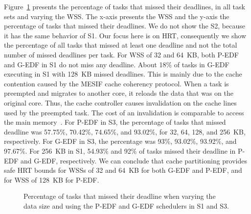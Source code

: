 \documentclass[10pt, conference, compsocconf]{IEEEtran}
\newcommand{\fig}[4][ht!]{
  \begin{figure}[#1]
    {\centering{\texttt{[image: fig/\#2]}}\par}
    \caption{#3}
    \label{fig:#2}
  \end{figure}
}
\begin{document}
Figure~\ref{fig:percentage_of_missed_deadlines} presents the percentage of tasks that missed their deadlines, in all task sets and varying the WSS. The x-axis presents the WSS and the y-axis the percentage of tasks that missed their deadlines. We do not show the S2, because it has the same behavior of S1. Our focus here is on HRT, consequently we show the percentage of all tasks that missed at least one deadline and not the total number of missed deadlines per task. For WSS of 32 and 64~KB, both P-EDF and G-EDF in S1 do not miss any deadline. About 18\% of tasks in G-EDF executing in S1 with 128~KB missed deadlines. This is mainly due to the cache contention caused by the MESIF cache coherency protocol. When a task is preempted and migrates to another core, it reloads the data that was on the original core. Thus, the cache controller causes invalidation on the cache lines used by the preempted task. The cost of an invalidation is comparable to access the main memory~\cite{intelopt}. For P-EDF in S3, the percentage of tasks that missed deadline was 57.75\%, 70.42\%, 74.65\%, and 93.02\%, for 32, 64, 128, and 256~KB, respectively. For G-EDF in S3, the percentage was 93\%, 93.02\%, 93.92\%, and 97.67\%. For 256~KB in S1, 54.93\% and 92\% of tasks missed their deadline in P-EDF and G-EDF, respectively. We can conclude that cache partitioning provides safe HRT bounds for WSSs of 32 and 64~KB for both G-EDF and P-EDF, and for WSS of 128~KB for P-EDF. 

\fig{percentage_of_missed_deadlines}{Percentage of tasks that missed their deadline when varying the data size and using the P-EDF and G-EDF schedulers in S1 and S3.}{scale=.37}
\end{document}
